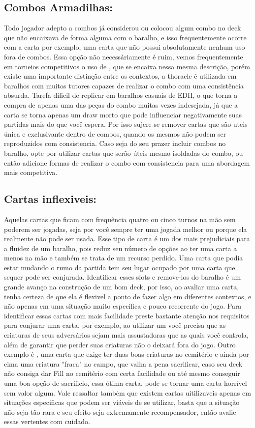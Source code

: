 \subsection{Combos Armadilhas:}
Todo jogador adepto a combos já considerou ou colocou algum combo no deck que não encaixava de forma alguma com o baralho, e isso frequentemente ocorre com a carta  por exemplo, uma carta que não possui absolutamente nenhum uso fora de combos.
Essa opção não necessáriamente é ruim, vemos frequentemente em torneios competitivos o uso de , que se encaixa nessa mesma descrição, porém existe uma importante distinção entre os contextos, a thoracle é utilizada em baralhos com muitos tutores capazes de realizar o combo com uma consistência absurda.
Tarefa dificil de replicar em baralhos casuais de EDH, o que torna a compra de apenas uma das peças do combo muitas vezes indesejada, já que a carta se torna apenas um draw morto que pode influenciar negativamente suas partidas mais do que você espera.
Por isso sujere-se remover cartas que são uteis única e exclusivante dentro de combos, quando os mesmos não podem ser reproduzidos com consistencia.
Caso seja do seu prazer incluir combos no baralho, opte por utilizar cartas que serão úteis mesmo isoldadas do combo, ou então adicione formas de realizar o combo com consistencia para uma abordagem mais competitiva.


\subsection{Cartas inflexiveis:}
Aquelas cartas que ficam com frequência quatro ou cinco turnos na mão sem poderem ser jogadas, seja por você sempre ter uma jogada melhor ou porque ela realmente não pode ser usada.
Esse tipo de carta é um dos mais prejudiciais para a fluidez de um baralho, pois reduz seu número de opções ao ter uma carta a menos na mão e também se trata de um recurso perdido. Uma carta que podia estar mudando o rumo da partida tem seu lugar ocupado por uma carta que sequer pode ser conjurada.
Identificar esses slots e remove-los do baralho é um grande avanço na construção de um bom deck, por isso, ao avaliar uma carta, tenha certeza de que ela é flexivel a ponto de fazer algo em diferentes contextos, e não apenas em uma situação muito específica e pouco recorrente do jogo.
Para identificar essas cartas com mais facilidade preste bastante atenção nos requisitos para conjurar uma carta, por exemplo, ao utilizar um  você precisa que as criaturas de seus adversários sejam mais assustadoras que as quais você controla, além de garantir que perder suas criaturas não o deixará fora do jogo.
Outro exemplo é , uma carta que exige ter duas boas criaturas no cemitério e ainda por cima uma criatura "fraca" no campo, que valha a pena sacrificar, caso seu deck não consiga dar Fill no cemitério com certa facilidade ou até mesmo conseguir uma boa opção de sacrificio, essa ótima carta, pode se tornar uma carta horrível sem valor algum.
Vale ressaltar também que existem cartas uitilizaveis apenas em situações especificas que podem ser viáveis de se utilizar, basta que a situação não seja tão rara e seu efeito seja extremamente recompensador, então avalie essas vertentes com cuidado.

